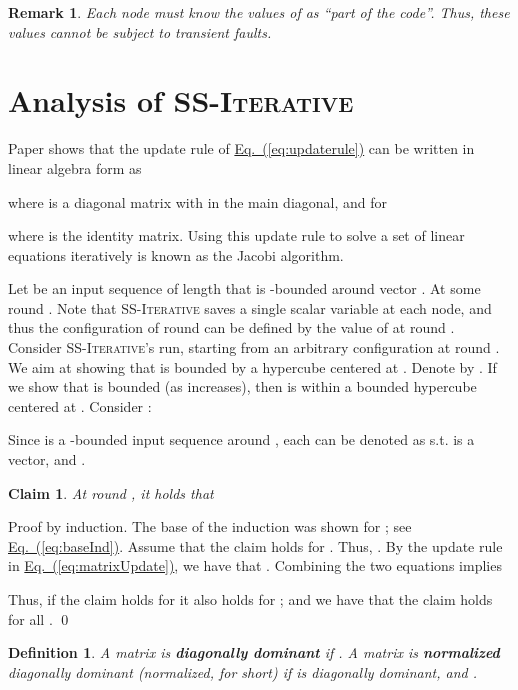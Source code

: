 \documentclass[preprint,12pt]{elsarticle}
\newtheorem{definition}{Definition}
\newtheorem{claim}{Claim}
\newtheorem{remark}{Remark}
\newenvironment{proof}{\noindent{\bf Proof:~~}}{}
\newcommand{\namedrefeq}[2]{\hyperref[#2]{#1~\mbox{\rm(\ref*{#2})}}}
\newcommand{\equationref}[1]{\namedrefeq{Eq.}{#1}}
\newcommand{\syncAlg}{\textsc{SS-Iterative}\xspace}
\begin{document}
\begin{remark}\label{rem:partofcode}
  Each node  must know the values of  as ``part of the
  code''. Thus, these values cannot be subject to transient
  faults.
\end{remark}

\section{Analysis of \syncAlg}\label{sec:analysis}
Paper \cite{BibDB:BookBertsekasTsitsiklis} shows that the update rule of
\equationref{eq:updaterule} can be written in linear algebra form
as

where  is a diagonal matrix with  in the main
diagonal, and  for 

 where  is the identity matrix. Using this update rule to solve a set of linear equations iteratively is  known as the Jacobi
algorithm.



Let  be an input sequence of length  that is
-bounded around vector . At some round   . Note
that \syncAlg saves a single scalar variable at each node, and thus the
configuration of round  can be defined by the value of
 at round . Consider \syncAlg's run, starting from an
arbitrary configuration at round . We aim at showing that
 is bounded by a hypercube centered at . Denote
by . If we show
that  is bounded (as  increases),
then  is within a bounded hypercube centered at .
Consider :

Since  is a -bounded input sequence around
, each  can be denoted as
 s.t.  is a vector, and . 



\begin{claim}
At round , it holds that 
\end{claim}
\begin{proof}
  Proof by induction. The base of the induction was shown for ; see \equationref{eq:baseInd}. Assume that the claim holds for . Thus, . By the update rule in
  \equationref{eq:matrixUpdate}, we have that . Combining the two equations implies
  
  Thus, if the claim holds for  it also holds for ;
  and we have that the claim holds for all .
  \qed
\end{proof}


\begin{definition}
  A matrix  is {\bf diagonally dominant} if
  . A matrix  is {\bf normalized} diagonally dominant (normalized, for short) if
   is diagonally dominant, and .
\end{definition}
\end{document}

